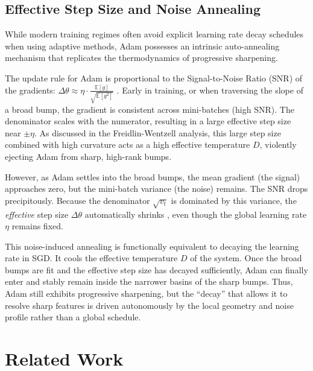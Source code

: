 \documentclass{article}
\begin{document}
\subsection{Effective Step Size and Noise Annealing}

While modern training regimes often avoid explicit learning rate decay schedules when using adaptive methods, Adam possesses an intrinsic auto-annealing mechanism that replicates the thermodynamics of progressive sharpening.

The update rule for Adam is proportional to the Signal-to-Noise Ratio (SNR) of the gradients: $\Delta \theta \approx \eta \cdot \frac{\mathbb{E}[g]}{\sqrt{\mathbb{E}[g^2]}}$ \cite{kingma2014adam}. Early in training, or when traversing the slope of a broad bump, the gradient is consistent across mini-batches (high SNR). The denominator scales with the numerator, resulting in a large effective step size near $\pm \eta$. As discussed in the Freidlin-Wentzell analysis, this large step size combined with high curvature acts as a high effective temperature $D$, violently ejecting Adam from sharp, high-rank bumps.

However, as Adam settles into the broad bumps, the mean gradient (the signal) approaches zero, but the mini-batch variance (the noise) remains. The SNR drops precipitously. Because the denominator $\sqrt{v_t}$ is dominated by this variance, the \emph{effective} step size $\Delta \theta$ automatically shrinks \cite{orvieto2025adam}, even though the global learning rate $\eta$ remains fixed.

This noise-induced annealing is functionally equivalent to decaying the learning rate in SGD. It cools the effective temperature $D$ of the system. Once the broad bumps are fit and the effective step size has decayed sufficiently, Adam can finally enter and stably remain inside the narrower basins of the sharp bumps. Thus, Adam still exhibits progressive sharpening, but the ``decay'' that allows it to resolve sharp features is driven autonomously by the local geometry and noise profile rather than a global schedule.

\section{Related Work}
\end{document}
